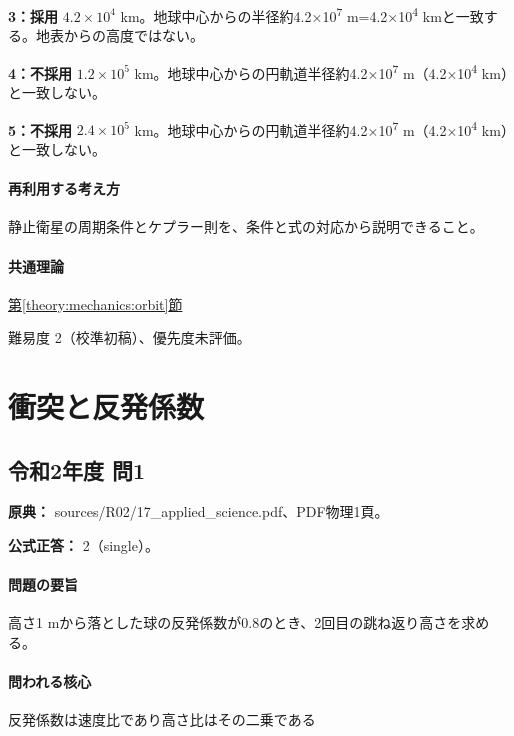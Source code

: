 \noindent\textbf{3：採用} \(4.2\times10^4\) km。地球中心からの半径約4.2×10\textsuperscript{7} m=\allowbreak{}4.2×10\textsuperscript{4} kmと一致する。地表からの高度ではない。\par

\noindent\textbf{4：不採用} \(1.2\times10^5\) km。地球中心からの円軌道半径約4.2×10\textsuperscript{7} m（4.2×10\textsuperscript{4} km）と一致しない。\par

\noindent\textbf{5：不採用} \(2.4\times10^5\) km。地球中心からの円軌道半径約4.2×10\textsuperscript{7} m（4.2×10\textsuperscript{4} km）と一致しない。\par

\paragraph{再利用する考え方} 静止衛星の周期条件とケプラー則を、条件と式の対応から説明できること。

\paragraph{共通理論} \hyperref[theory:mechanics:orbit]{第\ref*{theory:mechanics:orbit}節}

\par 難易度 2（校準初稿）、優先度未評価。

\section{衝突と反発係数}

\subsection{令和2年度 問1}
\label{q:r02-reg-applied-01}

\noindent\textbf{原典：} sources/R02/17\_applied\_science.pdf、PDF物理1頁。

\textbf{公式正答：} 2（single）。

\paragraph{問題の要旨} 高さ1 mから落とした球の反発係数が0.8のとき、2回目の跳ね返り高さを求める。

\paragraph{問われる核心} 反発係数は速度比であり高さ比はその二乗である

